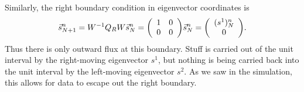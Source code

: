 \documentclass[12pt]{article}
\begin{document}
  Similarly, the right boundary condition in eigenvector coordinates is
  $$\vec{s}_{N+1}^n = W^{-1}Q_RW\vec{s}_N^n =\qty(\begin{array}{cc} 1 & 0 \\  0  & 0\end{array}) \vec{s}_N^n = \qty(\begin{array}{c} (s^1)^n_N \\ 0 \end{array}).$$
  Thus there is only outward flux at this boundary.  Stuff is carried out of the unit interval by the right-moving eigenvector $s^1$, but nothing is being carried back into the unit interval by the left-moving eigenvector $s^2$.  As we saw in the simulation, this allows for data to escape out the right boundary.

\newpage
\end{document}

